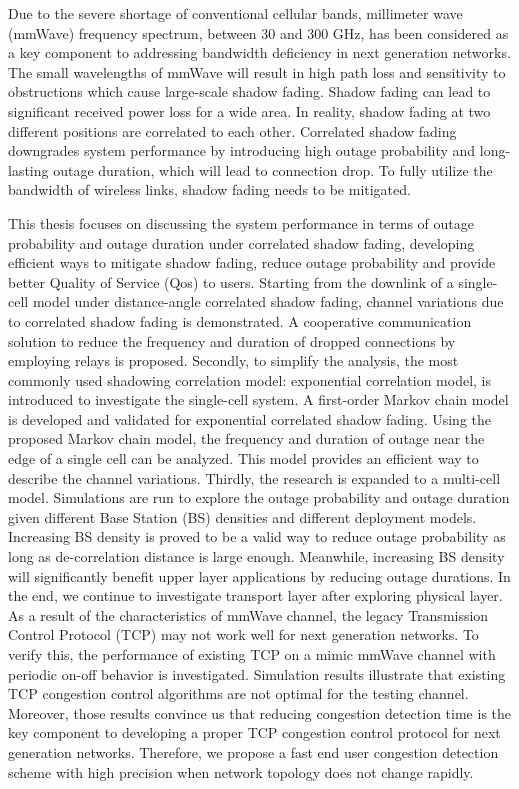 \par Due to the severe shortage of conventional cellular bands, millimeter wave (mmWave) frequency spectrum, between 30 and 300 GHz, has been considered as a key component to addressing bandwidth deficiency in next generation networks. The small wavelengths of mmWave will result in high path loss and sensitivity to obstructions which cause large-scale shadow fading. Shadow fading can lead to significant received power loss for a wide area. In reality, shadow fading at two different positions are correlated to each other. Correlated shadow fading downgrades system performance by introducing high outage probability and long-lasting outage duration, which will lead to connection drop. To fully utilize the bandwidth of wireless links, shadow fading needs to be mitigated.
\par This thesis focuses on discussing the system performance in terms of outage probability and outage duration under correlated shadow fading, developing efficient ways to mitigate shadow fading, reduce outage probability and provide better Quality of Service (Qos) to users. Starting from the downlink of a single-cell model under distance-angle correlated shadow fading, channel variations due to correlated shadow fading is demonstrated. A cooperative communication solution to reduce the frequency and duration of dropped connections by employing relays is proposed. Secondly, to simplify the analysis, the most commonly used shadowing correlation model: exponential correlation model, is introduced to investigate the single-cell system. A first-order Markov chain model is developed and validated for exponential correlated shadow fading. Using the proposed Markov chain model, the frequency and duration of outage near the edge of a single cell can be analyzed. This model provides an efficient way to describe the channel variations. Thirdly, the research is expanded to a multi-cell model. Simulations are run to explore the outage probability and outage duration given different Base Station (BS) densities and different deployment models. Increasing BS density is proved to be a valid way to reduce outage probability as long as de-correlation distance is large enough. Meanwhile, increasing BS density will significantly benefit upper layer applications by reducing outage durations. In the end, we continue to investigate transport layer after exploring physical layer. As a result of the characteristics of mmWave channel, the legacy Transmission Control Protocol (TCP) may not work well for next generation networks. To verify this, the performance of existing TCP on a mimic mmWave channel with periodic on-off behavior is investigated. Simulation results illustrate that existing TCP congestion control algorithms are not optimal for the testing channel. Moreover, those results convince us that reducing congestion detection time is the key component to developing a proper TCP congestion control protocol for next generation networks. Therefore, we propose a fast end user congestion detection scheme with high precision when network topology does not change rapidly.


